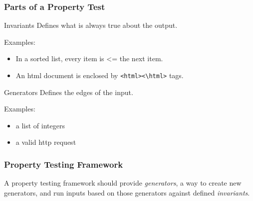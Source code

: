 \begin{frame}
  \frametitle{Parts of a Property Test}
  \begin{block}{Invariants}
    Defines what is always true about the output.

    Examples:
    \begin{itemize}
      \item In a sorted list, every item is <= the next item.
      \item An html document is enclosed by \texttt{<html><\textbackslash html>} tags.
    \end{itemize}
  \end{block}
  \begin{block}{Generators}
    Defines the edges of the input.

    Examples:
    \begin{itemize}
      \item a list of integers
      \item a valid http request
    \end {itemize}
  \end{block}
\end{frame}

\begin{frame}
  \frametitle{Property Testing Framework}
  A property testing framework should provide \emph{generators}, a way to create new generators, and run inputs based on those generators against defined \emph{invariants}.
\end{frame}
